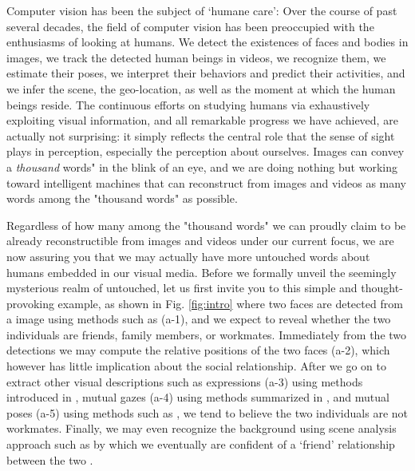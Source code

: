 \pagestyle{plain} 

\begin{center}
{\Large{\bf \mytitle}}
\end{center}
\vspace{-0.1in}

\label{sec:intro}

Computer vision has been the subject of `humane care': Over the course of past several decades, the field of computer vision has been preoccupied with the enthusiasms of looking at humans. We detect the existences of faces and bodies in images, we track the detected human beings in videos, we recognize them, we estimate their poses, we interpret their behaviors and predict their activities, and we infer the scene, the geo-location, as well as the moment at which the human beings reside. The continuous efforts on studying humans via exhaustively exploiting visual information, and all remarkable progress we have achieved, are actually not surprising: it simply reflects the central role that the sense of sight plays in perception, especially the perception about ourselves. Images can convey a \emph{thousand} words" in the blink of an eye, and we are doing nothing but working toward intelligent machines that can reconstruct from images and videos as many words among the "thousand words" as possible.

Regardless of how many among the "thousand words" we can proudly claim to be already reconstructible from images and videos under our current focus, we are now assuring you that we may actually have more untouched words about humans embedded in our visual media. Before we formally unveil the seemingly mysterious realm of untouched, let us first invite you to this simple and thought-provoking example, as shown in Fig. \ref{fig:intro} where two faces are detected from a image using methods such as \cite{ViolaJones} (a-1), and we expect to reveal whether the two individuals are friends, family members, or workmates. Immediately from the two detections we may compute the relative positions of the two faces (a-2), which however has little implication about the social relationship. After we go on to extract other visual descriptions such as expressions (a-3) using methods introduced in \cite{delaTorre:expression},  mutual gazes (a-4) using methods summarized in \cite{Hanson}, and mutual poses (a-5) using methods such as \cite{poselet}, we tend to believe the two individuals are not workmates. Finally, we may even recognize the background using scene analysis approach such as \cite{scene} by which we eventually are confident of a `friend' relationship between the two . 

